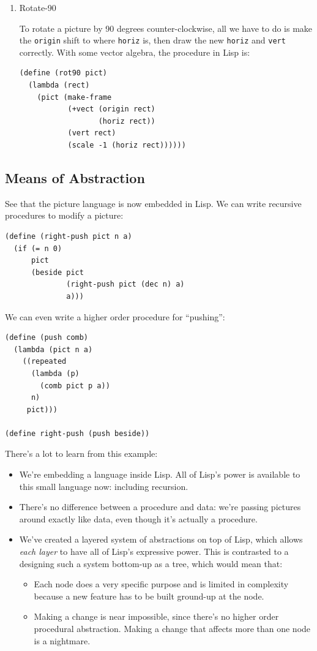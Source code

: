 \documentclass[9pt]{report}
\begin{document}
\begin{enumerate}
\item Rotate-90
\label{sec:org06c0be3}

To rotate a picture by 90 degrees counter-clockwise, all we have
to do is make the \texttt{origin} shift to where \texttt{horiz} is, then draw
the new \texttt{horiz} and \texttt{vert} correctly. With some vector algebra,
the procedure in Lisp is:

\begin{verbatim}
(define (rot90 pict)
  (lambda (rect)
    (pict (make-frame
           (+vect (origin rect)
                  (horiz rect))
           (vert rect)
           (scale -1 (horiz rect))))))
\end{verbatim}
\end{enumerate}


\subsection{Means of Abstraction}
\label{sec:orgc9ada64}
See that the picture language is now embedded in Lisp. We can
write recursive procedures to modify a picture:

\begin{verbatim}
(define (right-push pict n a)
  (if (= n 0)
      pict
      (beside pict
              (right-push pict (dec n) a)
              a)))
\end{verbatim}

We can even write a higher order procedure for ``pushing'':
\begin{verbatim}
(define (push comb)
  (lambda (pict n a)
    ((repeated
      (lambda (p)
        (comb pict p a))
      n)
     pict)))

(define right-push (push beside))
\end{verbatim}

There's a lot to learn from this example:
\begin{itemize}
\item We're embedding a language inside Lisp. All of Lisp's power is
available to this small language now: including recursion.
\item There's no difference between a procedure and data: we're
passing pictures around exactly like data, even though it's
actually a procedure.
\item We've created a layered system of abstractions on top of Lisp,
which allows \emph{each layer} to have all of Lisp's expressive
power. This is contrasted to a designing such a system bottom-up
as a tree, which would mean that:
\begin{itemize}
\item Each node does a very specific purpose and is limited in
complexity because a new feature has to be built ground-up at
the node.
\item Making a change is near impossible, since there's no higher
order procedural abstraction. Making a change that affects
more than one node is a nightmare.
\end{itemize}
\end{itemize}
\end{document}
